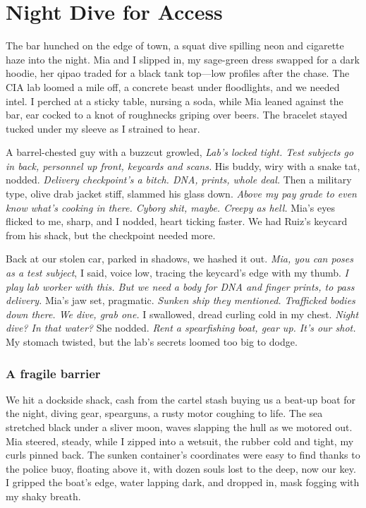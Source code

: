 \documentclass[12pt,oneside]{book}
\begin{document}
\chapter{Night Dive for Access}

The bar hunched on the edge of town, a squat dive spilling neon and cigarette haze into the night. Mia and I slipped in, my sage-green dress swapped for a dark hoodie, her qipao traded for a black tank top—low profiles after the chase. The CIA lab loomed a mile off, a concrete beast under floodlights, and we needed intel. I perched at a sticky table, nursing a soda, while Mia leaned against the bar, ear cocked to a knot of roughnecks griping over beers. The bracelet stayed tucked under my sleeve as I strained to hear.

A barrel-chested guy with a buzzcut growled, \textit{Lab’s locked tight. Test subjects go in back, personnel up front, keycards and scans.} His buddy, wiry with a snake tat, nodded. \textit{Delivery checkpoint’s a bitch. DNA, prints, whole deal.} Then a military type, olive drab jacket stiff, slammed his glass down. \textit{Above my pay grade to even know what’s cooking in there. Cyborg shit, maybe. Creepy as hell.} Mia’s eyes flicked to me, sharp, and I nodded, heart ticking faster. We had Ruiz’s keycard from his shack, but the checkpoint needed more.

Back at our stolen car, parked in shadows, we hashed it out. \textit{Mia, you can poses as a test subject}, I said, voice low, tracing the keycard’s edge with my thumb. \textit{I play lab worker with this. But we need a body for DNA and finger prints, to pass delivery.} Mia’s jaw set, pragmatic. \textit{Sunken ship they mentioned. Trafficked bodies down there. We dive, grab one.} I swallowed, dread curling cold in my chest. \textit{Night dive? In that water?} She nodded. \textit{Rent a spearfishing boat, gear up. It’s our shot.} My stomach twisted, but the lab’s secrets loomed too big to dodge.

\subsection*{A fragile barrier}

We hit a dockside shack, cash from the cartel stash buying us a beat-up boat for the night, diving gear, spearguns, a rusty motor coughing to life. The sea stretched black under a sliver moon, waves slapping the hull as we motored out. Mia steered, steady, while I zipped into a wetsuit, the rubber cold and tight, my curls pinned back. The sunken container's coordinates were easy to find thanks to the police buoy, floating above it, with dozen souls lost to the deep, now our key. I gripped the boat’s edge, water lapping dark, and dropped in, mask fogging with my shaky breath.
\end{document}
